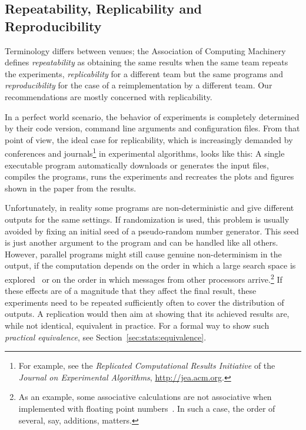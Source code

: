 \documentclass[algorithms,article,submit,moreauthors,pdftex]{Definitions/mdpi}
\begin{document}
\subsection{Repeatability, Replicability and Reproducibility}
\label{sub:reproducibility}
%
Terminology differs between venues; the Association of Computing Machinery defines \emph{repeatability} as obtaining the same results when the same team repeats the experiments,
\emph{replicability} for a different team but the same programs and \emph{reproducibility} for the case of a reimplementation by a different team.
Our recommendations are mostly concerned with replicability.

In a perfect world scenario, the behavior of experiments is completely determined by
their code version, command line arguments and configuration files.
%
From that point of view, the ideal case for replicability,
which is increasingly demanded by conferences and journals\footnote{For example, see the \emph{Replicated
Computational Results Initiative} of the \emph{Journal on Experimental
Algorithms}, \url{http://jea.acm.org}.} in
experimental algorithms, looks like this:
A single executable program automatically downloads or generates the input
files, compiles the programs, runs the experiments and recreates the plots and
figures shown in the paper from the results.

Unfortunately, in reality some programs are non-deterministic
and give different outputs for the same settings.
If randomization is used, this problem is usually avoided
by fixing an initial seed of a pseudo-random number generator.
This seed is just another argument to the program and can be handled like all others.
However, parallel programs might still cause genuine
non-determinism in the output, \eg if the computation depends on the order in which a large search space is
explored~\cite{hamadi2012parallel_sat_challenges,DBLP:conf/ipps/KimmigMS17}
or on the order in which messages from other processors arrive.\footnote{As an example, some associative
calculations are not associative when implemented with floating point numbers~\cite{Goldberg1991floating}.
In such a case, the order of several, say, additions, matters.}
If these effects are of a magnitude that they affect the final result, these experiments need to be repeated sufficiently often to cover the distribution of outputs.
A replication would then aim at showing that its achieved results are, while not identical, equivalent in practice.
For a formal way to show such \emph{practical equivalence}, see Section~\ref{sec:stats:equivalence}.
\end{document}
